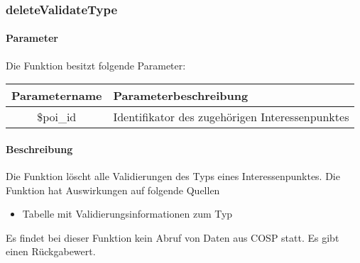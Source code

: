 \subsubsection{deleteValidateType}
\paragraph{Parameter} Die Funktion besitzt folgende Parameter:
\begin{table}[H]
	\begin{tabular}{|c|p{11cm}|}
		\hline
		\textbf{Parametername} & \textbf{Parameterbeschreibung} \\ \hline
		\$poi\_id & Identifikator des zugehörigen Interessenpunktes \\ \hline
	\end{tabular}
\end{table}
\paragraph{Beschreibung} Die Funktion löscht alle Validierungen des Typs eines Interessenpunktes. Die Funktion hat Auswirkungen auf folgende Quellen
\begin{itemize}
	\item Tabelle mit Validierungsinformationen zum Typ
\end{itemize}
Es findet bei dieser Funktion kein Abruf von Daten aus {\glqq COSP\grqq} statt. Es gibt einen Rückgabewert.